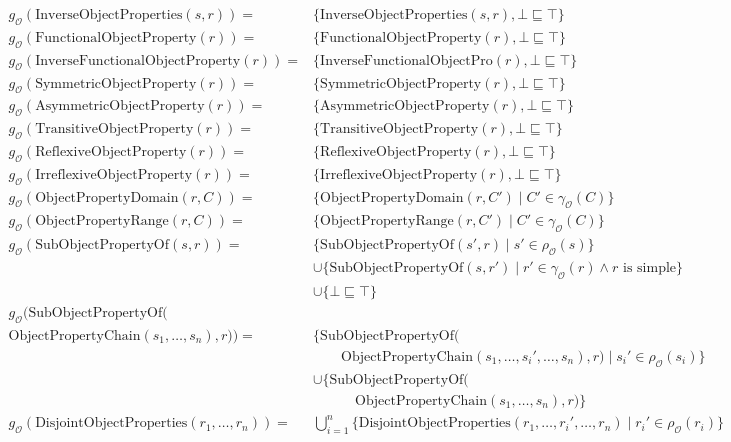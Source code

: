 \begin{align*}
    g_\mathcal{O}(\mathrm{InverseObjectProperties}(s, r)) =& \{ \mathrm{InverseObjectProperties}(s, r), \bot \sqsubseteq \top \} \\
    g_\mathcal{O}(\mathrm{FunctionalObjectProperty}(r)) =& \{ \mathrm{FunctionalObjectProperty}(r), \bot \sqsubseteq \top \} \\
    g_\mathcal{O}(\mathrm{InverseFunctionalObjectProperty}(r)) =& \{ \mathrm{InverseFunctionalObjectPro}(r), \bot \sqsubseteq \top \} \\
    g_\mathcal{O}(\mathrm{SymmetricObjectProperty}(r)) =& \{ \mathrm{SymmetricObjectProperty}(r), \bot \sqsubseteq \top \} \\
    g_\mathcal{O}(\mathrm{AsymmetricObjectProperty}(r)) =& \{ \mathrm{AsymmetricObjectProperty}(r), \bot \sqsubseteq \top \} \\
    g_\mathcal{O}(\mathrm{TransitiveObjectProperty}(r)) =& \{ \mathrm{TransitiveObjectProperty}(r), \bot \sqsubseteq \top \} \\
    g_\mathcal{O}(\mathrm{ReflexiveObjectProperty}(r)) =& \{ \mathrm{ReflexiveObjectProperty}(r), \bot \sqsubseteq \top \} \\
    g_\mathcal{O}(\mathrm{IrreflexiveObjectProperty}(r)) =& \{ \mathrm{IrreflexiveObjectProperty}(r), \bot \sqsubseteq \top \} \\
    g_\mathcal{O}(\mathrm{ObjectPropertyDomain}(r, C)) =& \{\mathrm{ObjectPropertyDomain}(r, C') \mid C' \in \gamma_\mathcal{O}  (C)\} \\
    g_\mathcal{O}(\mathrm{ObjectPropertyRange}(r, C)) =& \{\mathrm{ObjectPropertyRange}(r, C') \mid C' \in \gamma_\mathcal{O}  (C)\} \\
    g_\mathcal{O}(\mathrm{SubObjectPropertyOf}(s, r)) =& \{\mathrm{SubObjectPropertyOf}(s', r) \mid s' \in \rho_\mathcal{O} (s)\} \\& \cup \{\mathrm{SubObjectPropertyOf}(s, r') \mid r' \in \gamma_\mathcal{O}  (r) \land r \text{ is simple}\} \\& \cup \{ \bot \sqsubseteq \top \} \\
    g_\mathcal{O}(\mathrm{SubObjectPropertyOf}(\qquad \qquad \qquad \qquad &\\\mathrm{ObjectPropertyChain}(s_1, \dots, s_n), r)) =& \{\mathrm{SubObjectPropertyOf}( \\& \qquad \mathrm{ObjectPropertyChain}(s_1, \dots, s_i', \dots, s_n), r) \mid s_i' \in \rho_\mathcal{O} (s_i)\} \\& \cup \{\mathrm{SubObjectPropertyOf}( \\& \quad \qquad \mathrm{ObjectPropertyChain}(s_1, \dots, s_n), r)\} \\
    g_\mathcal{O}(\mathrm{DisjointObjectProperties}(r_1, \dots, r_n)) =& \bigcup_{i=1}^n \{ \mathrm{DisjointObjectProperties}(r_1, \dots, r_i', \dots, r_n) \mid r_i' \in \rho_\mathcal{O}(r_i) \} \\
\end{align*}
\endgroup
